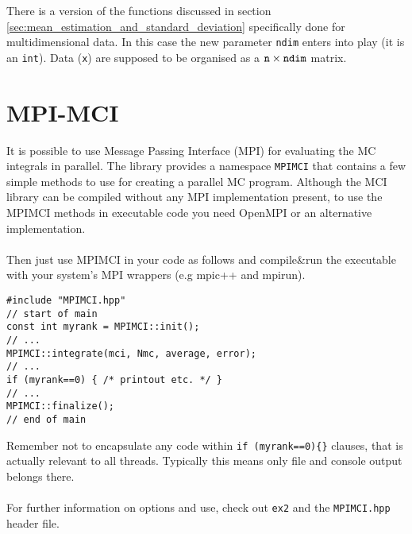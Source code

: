 \documentclass[11pt,a4paper,twoside]{article}
\begin{document}
There is a version of the functions discussed in section \ref{sec:mean_estimation_and_standard_deviation} specifically done for multidimensional data.
In this case the new parameter \verb+ndim+ enters into play (it is an \verb+int+).
Data (\verb+x+) are supposed to be organised as a $\verb+n+ \times \verb+ndim+$ matrix.

\section{MPI-MCI} %
\label{sec:mpimci}

It is possible to use Message Passing Interface (MPI) for evaluating the MC integrals
in parallel. The library provides a namespace \verb+MPIMCI+ that contains a few
simple methods to use for creating a parallel MC program. Although the MCI library can be
compiled without any MPI implementation present, to use the MPIMCI methods in
executable code you need OpenMPI or an alternative implementation.
\\\\Then just use MPIMCI in your code as follows and compile\&run the executable with your system's MPI wrappers (e.g mpic++ and mpirun).

\begin{verbatim}
#include "MPIMCI.hpp"
// start of main
const int myrank = MPIMCI::init();
// ...
MPIMCI::integrate(mci, Nmc, average, error);
// ...
if (myrank==0) { /* printout etc. */ }
// ...
MPIMCI::finalize();
// end of main
\end{verbatim}
Remember not to encapsulate any code within \verb+if (myrank==0){}+ clauses,
that is actually relevant to all threads. Typically this means only file and
console output belongs there.
\\\\For further information on options and use, check out \verb+ex2+ and the \verb+MPIMCI.hpp+ header file.



\printindex
\end{document}

